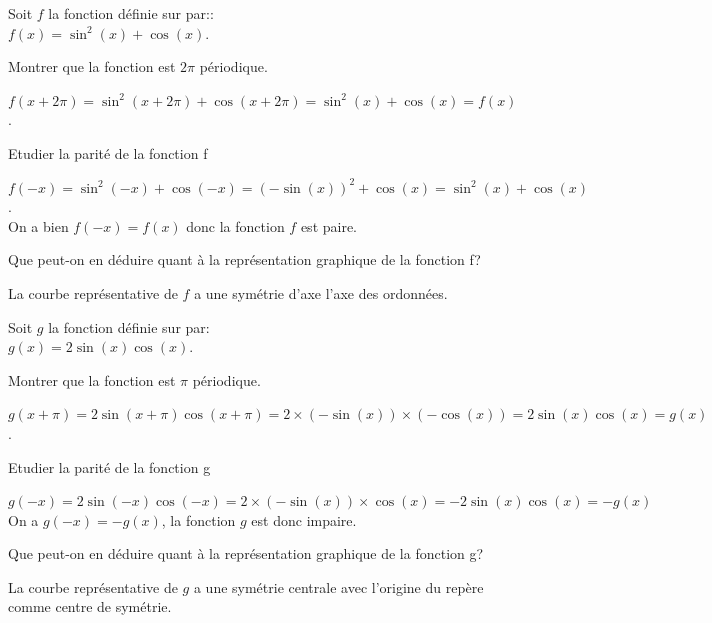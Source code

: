 \documentclass[12pt,a4paper]{article}  %
\begin{document}
%
\vspace{-.3cm} 
	Soit $f$ la fonction définie sur \R par::\\
	$f(x)=\sin^2(x)+\cos(x)$.
	\begin{enumMet}
		\item Montrer que la fonction est $2\pi$ périodique.
		\begin{corrBox}
			$f(x+2\pi)=\sin^2(x+2\pi)+\cos(x+2\pi)=\sin^2(x)+\cos(x)=f(x)$.
		\end{corrBox}
		\item Etudier la parité de la fonction f
		\begin{corrBox}
			$f(-x)=\sin^2(-x)+\cos (-x)=(-\sin(x))^2+\cos(x)=\sin^2(x)+\cos(x)$.\\
			On a bien $f(-x)=f(x)$ donc la fonction $f$ est paire.	
		\end{corrBox}
		\item Que peut-on en déduire quant à la représentation graphique de la fonction f?
		\begin{corrBox}
			La courbe représentative de $f$ a une symétrie d'axe l'axe des ordonnées.	
		\end{corrBox}
	\end{enumMet}
	\exerciceDS{ \ding{46} - ( 3 points )}
	Soit $g$ la fonction définie sur \R par:\\
	$g(x)=2\sin(x)\cos(x)$.
	\begin{enumMet}
		\item {} Montrer que la fonction est $\pi$ périodique.
		\begin{corrBox}
			$g(x+\pi)=2\sin(x+\pi)\cos(x+\pi)=2\times (-\sin(x))\times (-\cos(x))=2\sin(x)\cos(x)=g(x)$.
		\end{corrBox}
		\item {} Etudier la parité de la fonction g
		\begin{corrBox}
			$g(-x)=2\sin(-x)\cos(-x)=2\times (-\sin(x))\times \cos(x)=-2\sin(x)\cos(x)=-g(x)$\\
			On a $g(-x)=-g(x)$, la fonction $g$ est donc impaire.
		\end{corrBox}
		\item {} Que peut-on en déduire quant à la représentation graphique de la fonction g?
		\begin{corrBox}
			La courbe représentative de $g$ a une symétrie centrale avec l'origine du repère comme centre de symétrie.	
		\end{corrBox}
	\end{enumMet}
\end{document}
